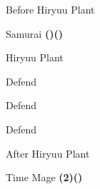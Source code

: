 \begin{paracol}{2}
\begin{menu}{Before Hiryuu Plant}
    \varwb
    \begin{jobMenu}
        \bartz Samurai \textbf{(\pointLeft)(\pointDown)} \equip{\dancingDagger}
    \end{jobMenu}
    \varwe
\end{menu}

\begin{boss}{Hiryuu Plant}
    \varwb
    \begin{round}{1}
        \galuf Defend
        \faris \leftCommand{\gilToss}
        \bartz \leftCommand{\gilToss}
        \item {}
        \vspace{1mm}
        \item[] 
        \lenna Defend
    \end{round}
    \begin{round}{2}
        \galuf Defend
        \faris \leftCommand{\gilToss}
        \bartz \leftCommand{\gilToss}
    \end{round}
    \varwe
\end{boss}

\begin{menu}{After Hiryuu Plant}
    \varwb
    \begin{jobMenu}
        \faris Time Mage \textbf{(2\pointLeft)(\pointUp)}
    \end{jobMenu}
    \begin{magicMenu}
        \faris \exit
    \end{magicMenu}
    \varwe
\end{menu}

\end{paracol}